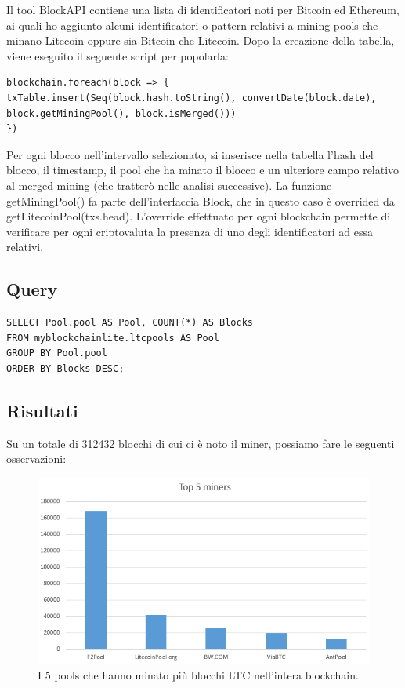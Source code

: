 Il tool BlockAPI contiene una lista di identificatori noti per Bitcoin ed Ethereum, ai quali ho aggiunto alcuni identificatori o pattern relativi a mining pools che minano Litecoin oppure sia Bitcoin che Litecoin. 
Dopo la creazione della tabella, viene eseguito il seguente script per popolarla:

\begin{lstlisting}
blockchain.foreach(block => {
txTable.insert(Seq(block.hash.toString(), convertDate(block.date), block.getMiningPool(), block.isMerged()))
})
\end{lstlisting}

Per ogni blocco nell’intervallo selezionato, si inserisce nella tabella l’hash del blocco, il timestamp, il pool che ha minato il blocco e un ulteriore campo relativo al merged mining (che tratterò nelle analisi successive). La funzione getMiningPool() fa parte dell’interfaccia Block, che in questo caso è overrided da getLitecoinPool(txs.head). L’override effettuato per ogni blockchain permette di verificare per ogni criptovaluta la presenza di uno degli identificatori ad essa relativi.


\subsection{Query}

\begin{lstlisting}
SELECT Pool.pool AS Pool, COUNT(*) AS Blocks
FROM myblockchainlite.ltcpools AS Pool
GROUP BY Pool.pool
ORDER BY Blocks DESC;
\end{lstlisting}

\subsection{Risultati}

Su un totale di 312432 blocchi di cui ci è noto il miner, possiamo fare le seguenti osservazioni:

\begin{figure}[h!]
	\centering
	\includegraphics[width=1.0\linewidth]{images/top5miners}
	\caption{I 5 pools che hanno minato più blocchi LTC nell'intera blockchain.}
	\label{fig:top5miners}
\end{figure}


